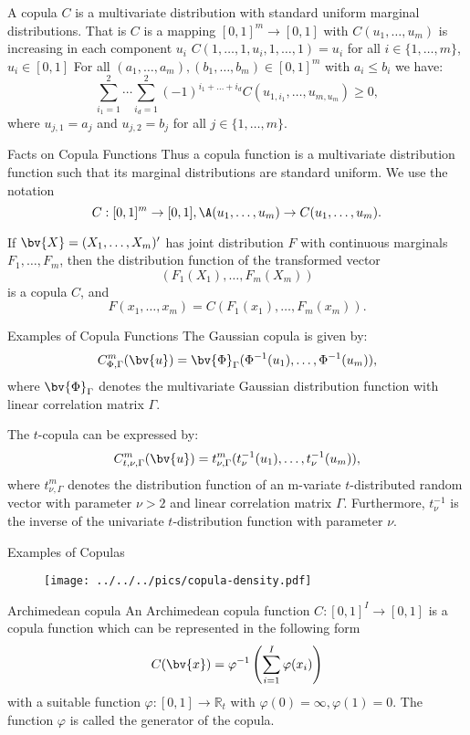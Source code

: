 	A copula $C$ is a multivariate distribution with standard uniform
	marginal distributions. That is $C$ is a mapping $[0,1]^m
	\rightarrow [0,1]$ with
		$C(u_1,\ldots,u_m)$ is increasing in each component $u_i$
		$C(1,\ldots,1,u_i,1,\ldots,1)=u_i$ for all $i\in\{1,\ldots,m\}$, $u_i\in[0,1]$
		For all $(a_1,\ldots,a_m), (b_1,\ldots,b_m)\in[0,1]^m$ with $a_i\leq b_i$ we have:
			$$
			\sum_{i_1=1}^2\cdots\sum_{i_d=1}^2(-1)^{i_1+\ldots+i_d}C(u_{1,i_1},\ldots,u_{m,u_m})
			\geq 0,
			$$
	where $u_{j,1}=a_j$ and $u_{j,2}=b_j$ for all $j \in \{1,\ldots,m\}$.


Facts on Copula Functions
	Thus a copula function is a multivariate distribution function
	such that its marginal distributions are standard uniform. We use
	the notation
	$$
	C:[0,1]^m \rightarrow [0,1], \A (u_1, \ldots, u_m)\rightarrow
	C(u_1, \ldots, u_m).
	$$

	If $\bv{X}=(X_1,\ldots,X_m)'$ has joint distribution $F$ with
	continuous marginals $F_1,\ldots,F_m$, then the distribution
	function of the transformed vector
	$$
	(F_1(X_1),\ldots,F_m(X_m))
	$$
	is a copula $C$, and
	$$
	F(x_1,\ldots,x_m)=C(F_1(x_1),\ldots,F_m(x_m)).
	$$


Examples of Copula Functions
	The Gaussian copula is given by:
	$$
	C^m_{\Phi,\Gamma}(\bv{u})=\bv{\Phi}_{\Gamma}(\Phi^{-1}(u_1),\ldots,\Phi^{-1}(u_m)),
	$$
	where $\bv{\Phi}_{\Gamma}$ denotes the multivariate Gaussian
	distribution function with linear correlation matrix $\Gamma$.


	The $t$-copula can be expressed by:
	$$
	C^m_{t,\nu,\Gamma}(\bv{u})=t^m_{\nu,\Gamma}(t_\nu^{-1}(u_1),\ldots,t_{\nu}^{-1}(u_m)),
	$$
	where $t^m_{\nu,\Gamma}$ denotes the distribution function of an
	m-variate $t$-distributed random vector with parameter $\nu>2$ and
	linear correlation matrix $\Gamma$. Furthermore, $t^{-1}_\nu$ is
	the inverse of  the univariate $t$-distribution function with
	parameter $\nu$.


Examples of Copulas
	\begin{center}
	\begin{figure}
	\texttt{[image: ../../../pics/copula-density.pdf]}
	\end{figure}
	\end{center}


Archimedean copula
	An Archimedean copula function $C:[0,1]^{I}\rightarrow[0,1]$ is a
	copula function which can be represented in the following form
		$$
		C(\bv{x})=\varphi^{-1}\left(\sum_{i=1}^{I}\varphi(x_i)\right)
		$$
	with a suitable function $\varphi:[0,1]\rightarrow\mathbb{R}_t$
	with $\varphi(0)=\infty, \varphi(1)=0$. The function $\varphi$ is
	called the generator of the copula.


